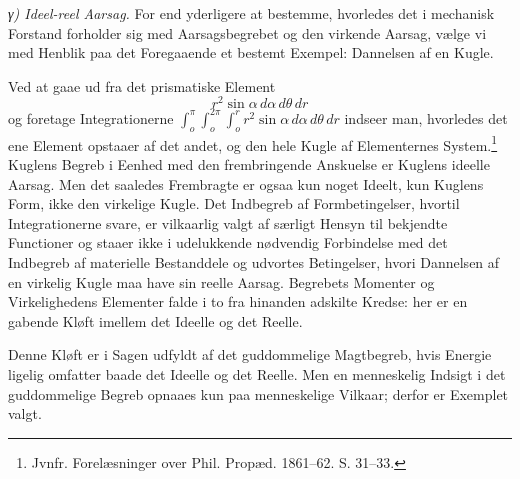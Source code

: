 \documentclass[12pt,a4paper]{book}
\newcommand{\subrunin}[1]{\emph{#1}\hspace{0.4em}}
\begin{document}
\subrunin{γ) Ideel-reel Aarsag.} For end yderligere at bestemme,
hvorledes det i mechanisk Forstand forholder sig med Aarsagsbegrebet og
den virkende Aarsag, vælge vi med Henblik paa det Foregaaende et
bestemt Exempel: Dannelsen af en Kugle.

Ved at gaae ud fra det prismatiske Element
\[ r^{2}\sin\alpha\, d\alpha\, d\theta\, dr \]
og foretage Integrationerne $\int_{o}^{\pi}\int_{o}^{2\pi}\int_{o}^{r}
r^{2}\sin\alpha\, d\alpha\, d\theta\, dr$ indseer man, hvorledes det
ene Element opstaaer af det andet, og den hele Kugle af Elementernes
System.\footnote{%
Jvnfr. Forelæsninger over Phil. Propæd. 1861--62. S. 31--33.}
Kuglens
Begreb i Eenhed med den frembringende Anskuelse er Kuglens ideelle
Aarsag. Men det saaledes Frembragte er ogsaa kun noget Ideelt,
kun Kuglens Form, ikke den virkelige Kugle. Det Indbegreb af
Formbetingelser, hvortil Integrationerne svare, er vilkaarlig valgt af
særligt Hensyn til bekjendte Functioner og staaer ikke i udelukkende
nødvendig Forbindelse med det Indbegreb af materielle Bestanddele og
udvortes Betingelser, hvori Dannelsen af en virkelig Kugle maa have sin
reelle Aarsag. Begrebets Momenter og Virkelighedens Elementer falde i
to fra hinanden adskilte Kredse: her er en gabende Kløft imellem det
Ideelle og det Reelle.

Denne Kløft er i Sagen udfyldt af det guddommelige Magtbegreb, hvis
Energie ligelig omfatter baade det Ideelle og det Reelle. Men en
menneskelig Indsigt i det guddommelige Begreb opnaaes kun paa
menneskelige Vilkaar; derfor er Exemplet valgt.
\end{document}
